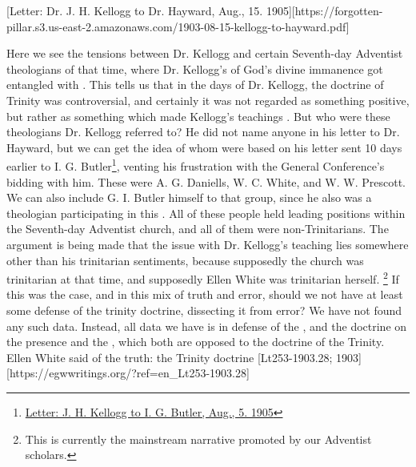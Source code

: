 [Letter: Dr. J. H. Kellogg to Dr. Hayward, Aug., 15. 1905][https://forgotten-pillar.s3.us-east-2.amazonaws.com/1903-08-15-kellogg-to-hayward.pdf]

Here we see the tensions between Dr. Kellogg and certain Seventh-day Adventist theologians of that time, where Dr. Kellogg's  of God's divine immanence got entangled with . This tells us that in the days of Dr. Kellogg, the doctrine of Trinity was controversial, and certainly it was not regarded as something positive, but rather as something which made Kellogg's teachings . But who were these theologians Dr. Kellogg referred to? He did not name anyone in his letter to Dr. Hayward, but we can get the idea of whom  were based on his letter sent 10 days earlier to I. G. Butler\footnote{\href{https://forgotten-pillar.s3.us-east-2.amazonaws.com/1905-08-05-kellogg-butler.pdf}{Letter: J. H. Kellogg to I. G. Butler, Aug., 5. 1905}}, venting his frustration with the General Conference's bidding with him. These were A. G. Daniells, W. C. White, and W. W. Prescott. We can also include G. I. Butler himself to that group, since he also was a theologian participating in this . All of these people held leading positions within the Seventh-day Adventist church, and all of them were non-Trinitarians. The argument is being made that the issue with Dr. Kellogg's teaching lies somewhere other than his trinitarian sentiments, because supposedly the church was trinitarian at that time, and supposedly Ellen White was trinitarian herself. \footnote{This is currently the mainstream narrative promoted by our Adventist scholars.} If this was the case, and in this mix of truth and error, should we not have at least some defense of the trinity doctrine, dissecting it from error? We have not found any such data. Instead, all data we have is in defense of the , and the doctrine on the presence and the , which both are opposed to the doctrine of the Trinity. Ellen White said of the truth: the Trinity doctrine [Lt253-1903.28; 1903][https://egwwritings.org/?ref=en\_Lt253-1903.28]

